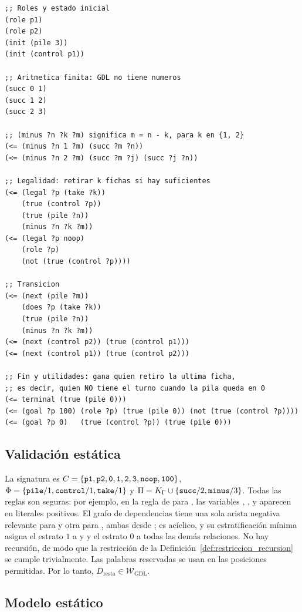 \begin{lstlisting}[caption={Descripción GDL del juego de la resta con una pila de tres fichas.},label={lst:an_resta}]
;; Roles y estado inicial
(role p1)
(role p2)
(init (pile 3))
(init (control p1))

;; Aritmetica finita: GDL no tiene numeros
(succ 0 1)
(succ 1 2)
(succ 2 3)

;; (minus ?n ?k ?m) significa m = n - k, para k en {1, 2}
(<= (minus ?n 1 ?m) (succ ?m ?n))
(<= (minus ?n 2 ?m) (succ ?m ?j) (succ ?j ?n))

;; Legalidad: retirar k fichas si hay suficientes
(<= (legal ?p (take ?k))
    (true (control ?p))
    (true (pile ?n))
    (minus ?n ?k ?m))
(<= (legal ?p noop)
    (role ?p)
    (not (true (control ?p))))

;; Transicion
(<= (next (pile ?m))
    (does ?p (take ?k))
    (true (pile ?n))
    (minus ?n ?k ?m))
(<= (next (control p2)) (true (control p1)))
(<= (next (control p1)) (true (control p2)))

;; Fin y utilidades: gana quien retiro la ultima ficha,
;; es decir, quien NO tiene el turno cuando la pila queda en 0
(<= terminal (true (pile 0)))
(<= (goal ?p 100) (role ?p) (true (pile 0)) (not (true (control ?p))))
(<= (goal ?p 0)   (true (control ?p)) (true (pile 0)))
\end{lstlisting}

\subsection{Validación estática}

La signatura es $C = \{\texttt{p1}, \texttt{p2}, \texttt{0}, \texttt{1}, \texttt{2}, \texttt{3}, \texttt{noop}, \texttt{100}\}$, $\Phi = \{\texttt{pile}/1, \texttt{control}/1, \texttt{take}/1\}$ y $\Pi = K_\Gamma \cup \{\texttt{succ}/2, \texttt{minus}/3\}$. Todas las reglas son seguras: por ejemplo, en la regla de  para , las variables , ,  y  aparecen en literales positivos. El grafo de dependencias tiene una sola arista negativa relevante para  y otra para , ambas desde ; es acíclico, y su estratificación mínima asigna el estrato $1$ a  y  y el estrato $0$ a todas las demás relaciones. No hay recursión, de modo que la restricción de la Definición~\ref{def:restriccion_recursion} se cumple trivialmente. Las palabras reservadas se usan en las posiciones permitidas. Por lo tanto, $D_{\text{resta}} \in \mathcal W_{\mathrm{GDL}}$.

\subsection{Modelo estático}

